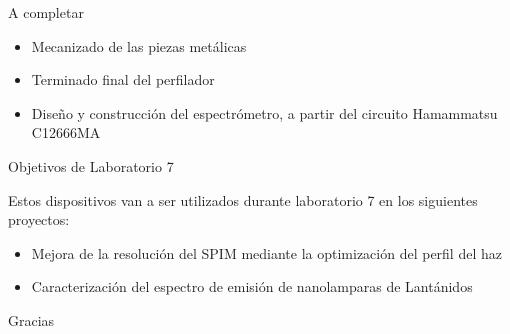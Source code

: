 \begin{frame}{A completar}
\begin{itemize}
\item Mecanizado de las piezas metálicas
\item Terminado final del perfilador
\item Diseño y construcción del espectrómetro, a partir del circuito Hamammatsu C12666MA
\end{itemize}
\end{frame}

\begin{frame}{Objetivos de Laboratorio 7}

Estos dispositivos van a ser utilizados durante laboratorio 7 en los siguientes proyectos:
\begin{itemize}
\item Mejora de la resolución del SPIM mediante la optimización del perfil del haz
\item Caracterización del espectro de emisión de nanolamparas de Lantánidos
\end{itemize}


\end{frame}



\begin{frame}[plain]{}
\centering

\Huge
Gracias

\end{frame}
